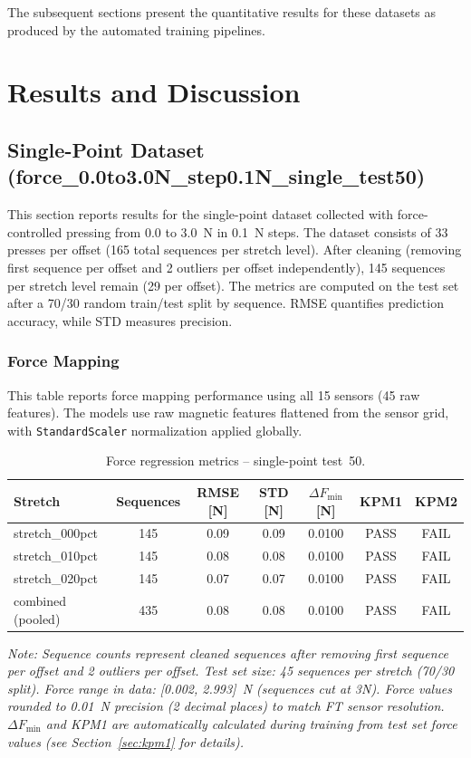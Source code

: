 \documentclass[11pt,a4paper]{article}
\begin{document}
The subsequent sections present the quantitative results for these datasets as produced by the automated training pipelines.

\section{Results and Discussion}
\label{sec:results}

\subsection{Single-Point Dataset (force\_0.0to3.0N\_step0.1N\_single\_test50)}
This section reports results for the single-point dataset collected with force-controlled pressing from 0.0 to 3.0~N in 0.1~N steps. The dataset consists of 33 presses per offset (165 total sequences per stretch level). After cleaning (removing first sequence per offset and 2 outliers per offset independently), 145 sequences per stretch level remain (29 per offset). The metrics are computed on the test set after a 70/30 random train/test split by sequence. RMSE quantifies prediction accuracy, while STD measures precision.

\subsubsection{Force Mapping}
This table reports force mapping performance using all 15 sensors (45 raw features). The models use raw magnetic features flattened from the sensor grid, with \texttt{StandardScaler} normalization applied globally.

\begin{table}[H]
    \centering
    \caption{Force regression metrics – single-point test~50.}
    \label{tab:force-single}
    \begin{tabular}{@{}lcccccc@{}}
        \toprule
        Stretch & Sequences & RMSE [N] & STD [N] & $\Delta F_{\text{min}}$ [N] & KPM1 & KPM2 \\
        \midrule
        stretch\_000pct & 145 & 0.09 & 0.09 & 0.0100 & PASS & FAIL \\
        stretch\_010pct & 145 & 0.08 & 0.08 & 0.0100 & PASS & FAIL \\
        stretch\_020pct & 145 & 0.07 & 0.07 & 0.0100 & PASS & FAIL \\
        combined (pooled) & 435 & 0.08 & 0.08 & 0.0100 & PASS & FAIL \\
        \bottomrule
    \end{tabular}
    \vspace{0.1cm}
    \footnotesize
    \textit{Note: Sequence counts represent cleaned sequences after removing first sequence per offset and 2 outliers per offset. Test set size: 45 sequences per stretch (70/30 split). Force range in data: [0.002, 2.993]~N (sequences cut at 3N). Force values rounded to 0.01~N precision (2 decimal places) to match FT sensor resolution. $\Delta F_{\text{min}}$ and KPM1 are automatically calculated during training from test set force values (see Section~\ref{sec:kpm1} for details).}
\end{table}
\end{document}
